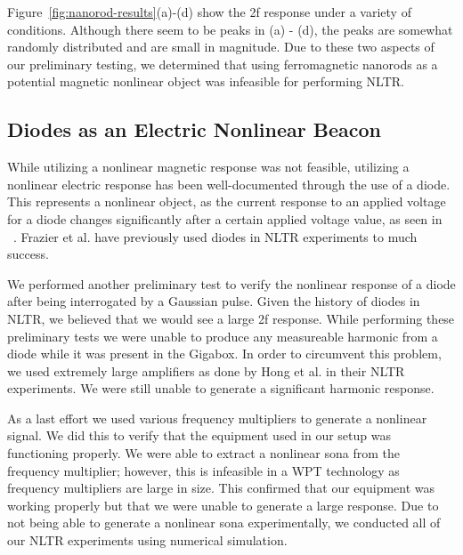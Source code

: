   Figure~\ref{fig:nanorod-results}(a)-(d) show the 2f response under a variety of conditions. Although there seem to be peaks in (a) - (d), the peaks are somewhat randomly distributed and are small in magnitude. Due to these two aspects of our preliminary testing, we determined that using ferromagnetic nanorods as a potential magnetic nonlinear object was infeasible for performing NLTR. 
  
\subsection{Diodes as an Electric Nonlinear Beacon}

While utilizing a nonlinear magnetic response was not feasible, utilizing a nonlinear electric response has been well-documented through the use of a diode. This represents a nonlinear object, as the current response to an applied voltage for a diode changes significantly after a certain applied voltage value, as seen in ~. Frazier et al. have previously used diodes in NLTR experiments to much success.

We performed another preliminary test to verify the nonlinear response of a diode after being interrogated by a Gaussian pulse. Given the history of diodes in NLTR, we believed that we would see a large 2f response. While performing these preliminary tests we were unable to produce any measureable harmonic from a diode while it was present in the Gigabox. In order to circumvent this problem, we used extremely large amplifiers as done by Hong et al. in their NLTR experiments. We were still unable to generate a significant harmonic response.

As a last effort we used various frequency multipliers to generate a nonlinear signal. We did this to verify that the equipment used in our setup was functioning properly. We were able to extract a nonlinear sona from the frequency multiplier; however, this is infeasible in a WPT technology as frequency multipliers are large in size. This confirmed that our equipment was working properly but that we were unable to generate a large response. Due to not being able to generate a nonlinear sona experimentally, we conducted all of our NLTR experiments using numerical simulation.
